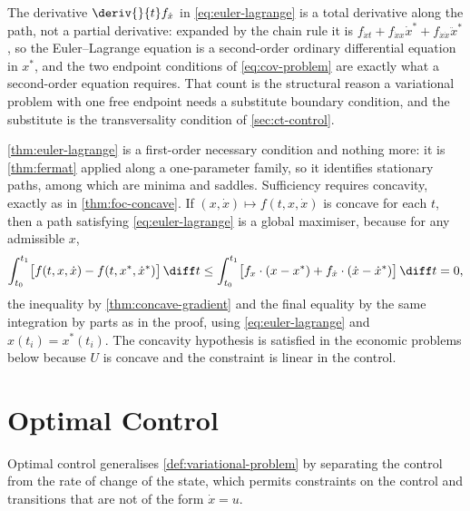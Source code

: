 The derivative $\deriv{}{t}f_{\dot x}$ in \eqref{eq:euler-lagrange} is a total
derivative along the path, not a partial derivative: expanded by the chain rule
it is
$f_{\dot xt}+f_{\dot xx}\dot x^{\ast}+f_{\dot x\dot x}\ddot x^{\ast}$, so the
Euler--Lagrange equation is a second-order ordinary differential equation in
$x^{\ast}$, and the two endpoint conditions of \eqref{eq:cov-problem} are exactly
what a second-order equation requires. That count is the structural reason a
variational problem with one free endpoint needs a substitute boundary condition,
and the substitute is the transversality condition of
\autoref{sec:ct-control}.

\begin{remark}\label{rem:el-necessary}
	\autoref{thm:euler-lagrange} is a first-order necessary condition and nothing
	more: it is \autoref{thm:fermat} applied along a one-parameter family, so it
	identifies stationary paths, among which are minima and saddles. Sufficiency
	requires concavity, exactly as in \autoref{thm:foc-concave}. If
	$(x,\dot x)\mapsto f(t,x,\dot x)$ is concave for each $t$, then a path
	satisfying \eqref{eq:euler-lagrange} is a global maximiser, because for any
	admissible $x$,
	\[
		\int_{t_0}^{t_1}\bigl[f(t,x,\dot x)-f(t,x^{\ast},\dot x^{\ast})\bigr]\,\diff t
		\leq\int_{t_0}^{t_1}\bigl[f_x\cdot(x-x^{\ast})
			+f_{\dot x}\cdot(\dot x-\dot x^{\ast})\bigr]\,\diff t=0,
	\]
	the inequality by \autoref{thm:concave-gradient} and the final equality by the
	same integration by parts as in the proof, using \eqref{eq:euler-lagrange} and
	$x(t_i)=x^{\ast}(t_i)$. The concavity hypothesis is satisfied in the economic
	problems below because $U$ is concave and the constraint is linear in the
	control.
\end{remark}

\section{Optimal Control}\label{sec:ct-control}

Optimal control generalises \autoref{def:variational-problem} by separating the
control from the rate of change of the state, which permits constraints on the
control and transitions that are not of the form $\dot x=u$.

